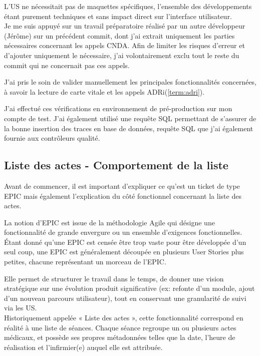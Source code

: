 \documentclass{article}
\begin{document}
L'US ne nécessitait pas de maquettes spécifiques, l'ensemble des développements étant purement techniques et sans impact direct sur l'interface utilisateur. \\

Je me suis appuyé sur un travail préparatoire réalisé par un autre développeur (Jérôme) sur un précédent commit, dont j'ai extrait uniquement les parties nécessaires concernant les appels CNDA. Afin de limiter les risques d'erreur et d'ajouter uniquement le nécessaire, j'ai volontairement exclu tout le reste du commit qui ne concernait pas ces appels.

J'ai pris le soin de valider manuellement les principales fonctionnalités concernées, à savoir la lecture de carte vitale et les appels ADRi(\ref{term:adri}).

J'ai effectué ces vérifications en environnement de pré-production sur mon compte de test. J'ai également utilisé une requête SQL permettant de s'assurer de la bonne insertion des traces en base de données, requête SQL que j'ai également fournie aux contrôleurs qualité.

\subsection{Liste des actes - Comportement de la liste}

Avant de commencer, il est important d'expliquer ce qu'est un ticket de type EPIC mais également l'explication du côté fonctionnel concernant la liste des actes.

La notion d'EPIC est issue de la méthodologie Agile qui désigne une fonctionnalité de grande envergure ou un ensemble d'exigences fonctionnelles. Étant donné qu'une EPIC est censée être trop vaste pour être développée d'un seul coup, une EPIC est généralement découpée en plusieurs User Stories plus petites, chacune représentant un morceau de l'EPIC.

Elle permet de structurer le travail dans le temps, de donner une vision stratégique sur une évolution produit significative (ex: refonte d'un module, ajout d'un nouveau parcours utilisateur), tout en conservant une granularité de suivi via les US. \\

Historiquement appelée « Liste des actes », cette fonctionnalité correspond en réalité à une liste de séances. Chaque séance regroupe un ou plusieurs actes médicaux, et possède ses propres métadonnées telles que la date, l'heure de réalisation et l'infirmier(e) auquel elle est attribuée.
\end{document}
